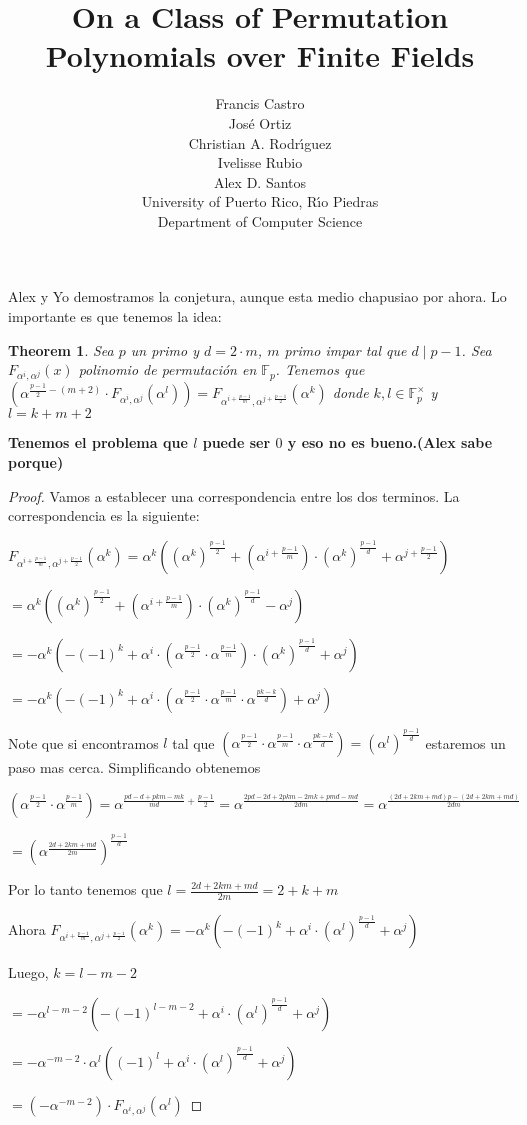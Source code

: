 \documentclass[12pt]{article}
\title{On a Class of Permutation Polynomials over Finite Fields}
\author{Francis Castro \\ Jos\'e Ortiz \\ Christian A. Rodr\'{\i}guez \\ Ivelisse Rubio \\ Alex D. Santos \\ University of Puerto Rico, R\'{\i}o Piedras \\ Department of Computer Science}
\date{}
\newtheorem{theorem}{Theorem}
\begin{document}
\maketitle

Alex y Yo demostramos la conjetura, aunque esta medio chapusiao por ahora. Lo importante es que tenemos la idea:
\begin{theorem}
Sea $p$ un primo y $d = 2\cdot m$, $m$ primo impar tal que $d\mid p-1$. Sea $F_{\alpha^i,\alpha^j}(x)$ polinomio de permutación en $\mathbb{F}_p$. Tenemos que $(\alpha^{\frac{p-1}{2}-\left(m+2\right)}\cdot F_{\alpha^i,\alpha^j}(\alpha^l)) = F_{\alpha^{i+\frac{p-1}{m}},\alpha^{j+\frac{p-1}{2}}}(\alpha^{k})$ donde $k,l \in \mathbb{F}_p^\times$ y $l=k+m+2$    
\end{theorem}


\textbf{Tenemos el problema que $l$ puede ser $0$ y eso no es bueno.(Alex sabe porque)}
\linebreak

\begin{proof}
Vamos a establecer una correspondencia entre los dos terminos. La correspondencia es la siguiente:

$F_{\alpha^{i+\frac{p-1}{m}},\alpha^{j+\frac{p-1}{2}}}(\alpha^{k}) = \alpha^k((\alpha^k)^{\frac{p-1}{2}}+(\alpha^{i+\frac{p-1}{m}})\cdot(\alpha^k)^{\frac{p-1}{d}}+\alpha^{j+\frac{p-1}{2}})$

$ = \alpha^k((\alpha^k)^{\frac{p-1}{2}}+(\alpha^{i+\frac{p-1}{m}})\cdot(\alpha^k)^{\frac{p-1}{d}}-\alpha^{j})$

$ = -\alpha^k(-(-1)^k+\alpha^{i}\cdot (\alpha^{\frac{p-1}{2}}\cdot \alpha^{\frac{p-1}{m}})\cdot(\alpha^k)^{\frac{p-1}{d}}+\alpha^{j})$

$ = -\alpha^k(-(-1)^k+\alpha^{i}\cdot (\alpha^{\frac{p-1}{2}}\cdot \alpha^{\frac{p-1}{m}} \cdot \alpha^{\frac{pk-k}{d}})+\alpha^{j})$

Note que si encontramos $l$ tal que $(\alpha^{\frac{p-1}{2}}\cdot \alpha^{\frac{p-1}{m}} \cdot \alpha^{\frac{pk-k}{d}}) = (\alpha^l)^{\frac{p-1}{d}}$ estaremos un paso mas cerca. Simplificando obtenemos

$(\alpha^{\frac{p-1}{2}}\cdot \alpha^{\frac{p-1}{m}}) = \alpha^{\frac{pd-d+pkm-mk}{md}+\frac{p-1}{2}}=\alpha^{\frac{2pd-2d+2pkm-2mk+pmd-md}{2dm}} = \alpha^{\frac{\left( 2d+2km+md \right)p-\left( 2d+2km+md \right)}{2dm}}$

$ = (\alpha^{\frac{2d+2km+md}{2m}})^{\frac{p-1}{d}} $

Por lo tanto tenemos que $l=\frac{2d+2km+md}{2m}=2+k+m$

Ahora $F_{\alpha^{i+\frac{p-1}{m}},\alpha^{j+\frac{p-1}{2}}}(\alpha^{k}) = -\alpha^k(-(-1)^k+\alpha^{i}\cdot (\alpha^{l})^{\frac{p-1}{d}}+\alpha^{j})$

Luego, $k = l-m-2$

$ = -\alpha^{l-m-2}(-(-1)^{l-m-2}+\alpha^{i}\cdot (\alpha^{l})^{\frac{p-1}{d}}+\alpha^{j})$

$ = -\alpha^{-m-2}\cdot \alpha^{l}((-1)^{l}+\alpha^{i}\cdot (\alpha^{l})^{\frac{p-1}{d}}+\alpha^{j})$

$ = (-\alpha^{-m-2}) \cdot F_{\alpha^i,\alpha^j}(\alpha^l)$
\end{proof}
\end{document}
